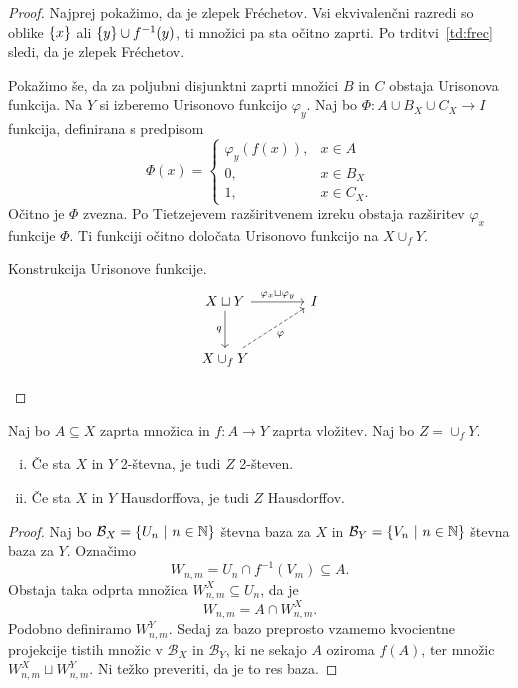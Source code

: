 \begin{proof}
Najprej pokažimo, da je zlepek Fréchetov. Vsi ekvivalenčni razredi
so oblike $\left\{x\right\}$ ali $\left\{y\right\} \cup f^{-1}(y)$, ti množici pa sta
očitno zaprti. Po trditvi~\ref{td:frec} sledi, da je zlepek
Fréchetov.

Pokažimo še, da za poljubni disjunktni zaprti množici $B$ in $C$
obstaja Urisonova funkcija. Na $Y$ si izberemo Urisonovo funkcijo
$\varphi_y$. Naj bo $\Phi \colon A \cup B_X \cup C_X \to I$
funkcija, definirana s predpisom
\[
\Phi(x) =
\begin{cases}
\varphi_y(f(x)), & x \in A \\
0,               & x \in B_X \\
1,               & x \in C_X.
\end{cases}
\]
Očitno je $\Phi$ zvezna. Po Tietzejevem razširitvenem izreku
obstaja razširitev $\varphi_x$ funkcije $\Phi$. Ti funkciji očitno
določata Urisonovo funkcijo na $X \cup_f Y$.

\begin{skica}{Konstrukcija Urisonove funkcije.}
\[
\begin{tikzcd}[column sep=large, row sep=large]
X \sqcup Y
\arrow[r, "\varphi_x \sqcup \varphi_y"]
\arrow[d, "q"']
& I \\
X \cup_f Y \arrow[ur, dashrightarrow, "\varphi"'] &
\end{tikzcd} \qedhere
\]
\end{skica}
\end{proof}

\begin{trditev}
Naj bo $A \subseteq X$ zaprta množica in $f \colon A \to Y$ zaprta
vložitev. Naj bo $Z = \cup_f Y$.

\begin{enumerate}[i)]
\item Če sta $X$ in $Y$ 2-števna, je tudi $Z$ 2-števen.
\item Če sta $X$ in $Y$ Hausdorffova, je tudi $Z$ Hausdorffov.
\end{enumerate}
\end{trditev}

\begin{proof}
Naj bo $\mathcal{B}_X = \left\{U_n~\middle\vert~n \in \mathbb{N}\right\}$ števna baza za $X$ in
$\mathcal{B}_Y = \left\{V_n~\middle\vert~n \in \mathbb{N}\right\}$ števna baza za $Y$. Označimo
\[
W_{n,m} = U_n \cap f^{-1}(V_m) \subseteq A.
\]
Obstaja taka odprta množica $W_{n,m}^X \subseteq U_n$, da je
\[
W_{n,m} = A \cap W_{n,m}^X.
\]
Podobno definiramo $W_{n,m}^Y$. Sedaj za bazo preprosto vzamemo
kvocientne projekcije tistih množic v $\mathcal{B}_X$ in
$\mathcal{B}_Y$, ki ne sekajo $A$ oziroma $f(A)$, ter množic
$W_{n,m}^X \sqcup W_{n,m}^Y$. Ni težko preveriti, da je to res
baza.
\end{proof}
